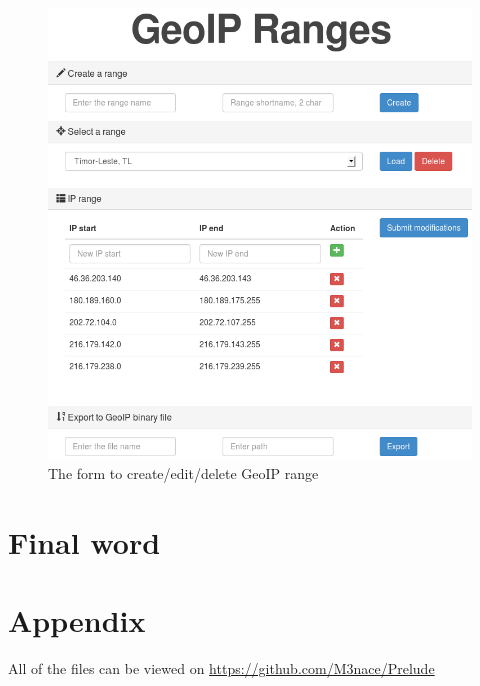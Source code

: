 \documentclass{koala-en}
\begin{document}
\begin{figure}[!ht]
  \center
  \includegraphics[width=15cm]{geoip.png}
  \caption{The form to create/edit/delete GeoIP range}
\end{figure}

\chapter{Final word}

\thispagestyle{fancy}
\newpage

\chapter{Appendix}

All of the files can be viewed on \url{https://github.com/M3nace/Prelude}
\end{document}
